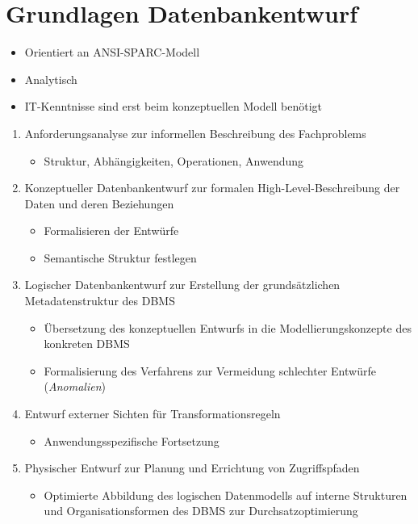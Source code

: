 \chapter{Grundlagen Datenbankentwurf}
\begin{itemize}
\item Orientiert an ANSI-SPARC-Modell
\item Analytisch
\item IT-Kenntnisse sind erst beim konzeptuellen Modell benötigt\end{itemize}
\begin{enumerate}
\item Anforderungsanalyse zur informellen Beschreibung des Fachproblems

\begin{itemize}
\item Struktur, Abhängigkeiten, Operationen, Anwendung
\end{itemize}
\item Konzeptueller Datenbankentwurf zur formalen High-Level-Beschreibung
der Daten und deren Beziehungen

\begin{itemize}
\item Formalisieren der Entwürfe
\item Semantische Struktur festlegen
\end{itemize}
\item Logischer Datenbankentwurf zur Erstellung der grundsätzlichen Metadatenstruktur
des DBMS

\begin{itemize}
\item Übersetzung des konzeptuellen Entwurfs in die Modellierungskonzepte
des konkreten DBMS
\item Formalisierung des Verfahrens zur Vermeidung schlechter Entwürfe (\emph{Anomalien})
\end{itemize}
\item Entwurf externer Sichten für Transformationsregeln

\begin{itemize}
\item Anwendungsspezifische Fortsetzung
\end{itemize}
\item Physischer Entwurf zur Planung und Errichtung von Zugriffspfaden

\begin{itemize}
\item Optimierte Abbildung des logischen Datenmodells auf interne Strukturen
und Organisationsformen des DBMS zur Durchsatzoptimierung
\end{itemize}
\end{enumerate}

